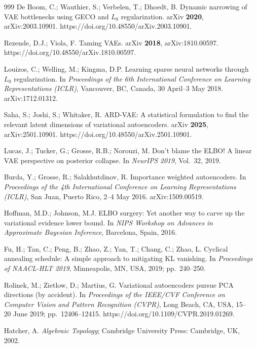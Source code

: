 \documentclass[make,article,submit,pdftex,moreauthors]{Definitions/mdpi}
\begin{document}
\begin{thebibliography}{999}
De Boom, C.; Wauthier, S.; Verbelen, T.; Dhoedt, B.
Dynamic narrowing of VAE bottlenecks using GECO and $L_0$ regularization.
arXiv \textbf{2020}, arXiv:2003.10901.
https://doi.org/10.48550/arXiv.2003.10901.

Rezende, D.J.; Viola, F.
Taming VAEs.
arXiv \textbf{2018}, arXiv:1810.00597.
https://doi.org/10.48550/arXiv.1810.00597.

Louizos, C.; Welling, M.; Kingma, D.P.
Learning sparse neural networks through $L_0$ regularization.
In \textit{Proceedings of the 6th International Conference on Learning
Representations (ICLR)}, Vancouver, BC, Canada, 30 April--3 May 2018.
arXiv:1712.01312.

Saha, S.; Joshi, S.; Whitaker, R.
ARD-VAE: A statistical formulation to find the relevant latent dimensions
of variational autoencoders.
arXiv \textbf{2025}, arXiv:2501.10901.
https://doi.org/10.48550/arXiv.2501.10901.

Lucas, J.; Tucker, G.; Grosse, R.B.; Norouzi, M.
Don't blame the ELBO! A linear VAE perspective on posterior collapse.
In \textit{NeurIPS 2019}, Vol.~32, 2019.

Burda, Y.; Grosse, R.; Salakhutdinov, R.
Importance weighted autoencoders.
In \textit{Proceedings of the 4th International Conference on Learning
Representations (ICLR)}, San Juan, Puerto Rico, 2--4 May 2016.
arXiv:1509.00519.

Hoffman, M.D.; Johnson, M.J.
{ELBO} surgery: Yet another way to carve up the variational evidence lower
bound.
In \textit{NIPS Workshop on Advances in Approximate Bayesian Inference},
Barcelona, Spain, 2016.

Fu, H.; Tan, C.; Peng, B.; Zhao, Z.; Yan, T.; Chang, C.; Zhao, L.
Cyclical annealing schedule: A simple approach to mitigating {KL} vanishing.
In \textit{Proceedings of NAACL-HLT 2019}, Minneapolis, MN, USA, 2019;
pp.~240--250.

Rolinek, M.; Zietlow, D.; Martius, G.
Variational autoencoders pursue PCA directions (by accident).
In \textit{Proceedings of the IEEE/CVF Conference on Computer Vision and
Pattern Recognition (CVPR)}, Long Beach, CA, USA, 15--20 June 2019;
pp.\ 12406--12415. https://doi.org/10.1109/CVPR.2019.01269.

Hatcher, A.
\textit{Algebraic Topology};
Cambridge University Press: Cambridge, UK, 2002.


\end{thebibliography}
\end{document}
